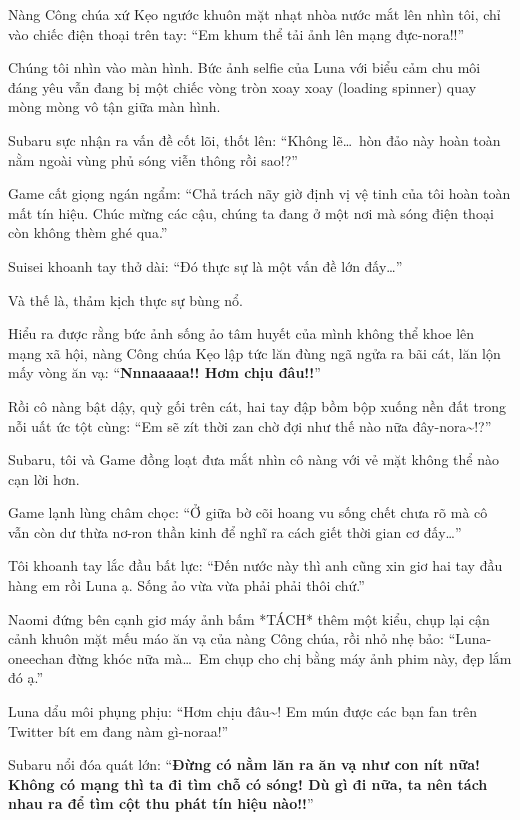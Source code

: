\documentclass[../main.tex]{subfiles}
\begin{document}
Nàng Công chúa xứ Kẹo ngước khuôn mặt nhạt nhòa nước mắt lên nhìn tôi, chỉ vào chiếc điện thoại trên tay: ``Em khum thể tải ảnh lên mạng đực-nora!!''

Chúng tôi nhìn vào màn hình. Bức ảnh selfie của Luna với biểu cảm chu môi đáng yêu vẫn đang bị một chiếc vòng tròn xoay xoay (loading spinner) quay mòng mòng vô tận giữa màn hình.


Subaru sực nhận ra vấn đề cốt lõi, thốt lên: ``Không lẽ\dots\ hòn đảo này hoàn toàn nằm ngoài vùng phủ sóng viễn thông rồi sao!?''

Game cất giọng ngán ngẩm: ``Chả trách nãy giờ định vị vệ tinh của tôi hoàn toàn mất tín hiệu. Chúc mừng các cậu, chúng ta đang ở một nơi mà sóng điện thoại còn không thèm ghé qua.''

Suisei khoanh tay thở dài: ``Đó thực sự là một vấn đề lớn đấy\dots''

Và thế là, thảm kịch thực sự bùng nổ.

Hiểu ra được rằng bức ảnh sống ảo tâm huyết của mình không thể khoe lên mạng xã hội, nàng Công chúa Kẹo lập tức lăn đùng ngã ngửa ra bãi cát, lăn lộn mấy vòng ăn vạ: ``\textbf{Nnnaaaaa!! Hơm chịu đâu!!}''

Rồi cô nàng bật dậy, quỳ gối trên cát, hai tay đập bồm bộp xuống nền đất trong nỗi uất ức tột cùng: ``Em sẽ zít thời zan chờ đợi như thế nào nữa đây-nora\~{}!?''


Subaru, tôi và Game đồng loạt đưa mắt nhìn cô nàng với vẻ mặt không thể nào cạn lời hơn.

Game lạnh lùng châm chọc: ``Ở giữa bờ cõi hoang vu sống chết chưa rõ mà cô vẫn còn dư thừa nơ-ron thần kinh để nghĩ ra cách giết thời gian cơ đấy\dots''

Tôi khoanh tay lắc đầu bất lực: ``Đến nước này thì anh cũng xin giơ hai tay đầu hàng em rồi Luna ạ. Sống ảo vừa vừa phải phải thôi chứ.''

Naomi đứng bên cạnh giơ máy ảnh bấm *TÁCH* thêm một kiểu, chụp lại cận cảnh khuôn mặt mếu máo ăn vạ của nàng Công chúa, rồi nhỏ nhẹ bảo: ``Luna-oneechan đừng khóc nữa mà\dots\ Em chụp cho chị bằng máy ảnh phim này, đẹp lắm đó ạ.''

Luna dẩu môi phụng phịu: ``Hơm chịu đâu\~{}! Em mún được các bạn fan trên Twitter bít em đang nàm gì-noraa!''

Subaru nổi đóa quát lớn: ``\textbf{Đừng có nằm lăn ra ăn vạ như con nít nữa! Không có mạng thì ta đi tìm chỗ có sóng! Dù gì đi nữa, ta nên tách nhau ra để tìm cột thu phát tín hiệu nào!!}''
\end{document}
